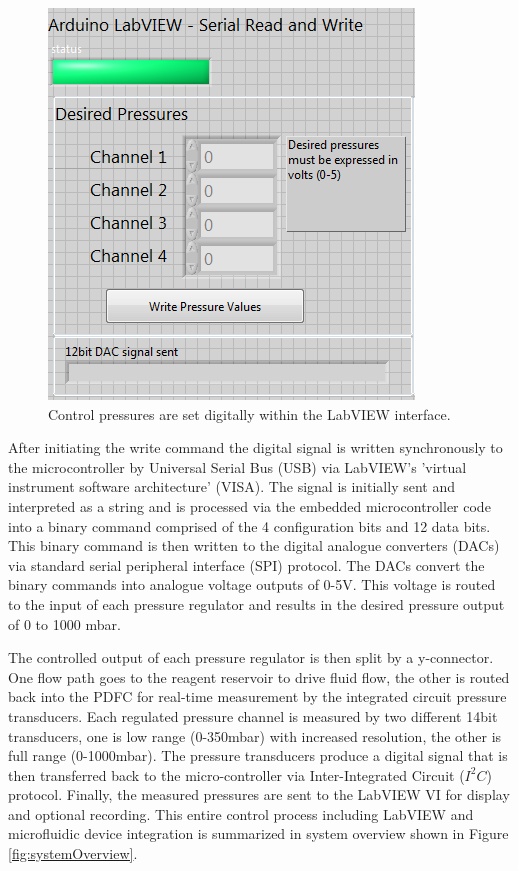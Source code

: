 \begin{figure}[H]
\centering 
\includegraphics[width=0.5\columnwidth]{writeVI.PNG} 
\caption[LabVIEW write command]{Control pressures are set digitally within the LabVIEW interface.} 
\label{fig:writeVI} 
\end{figure}

After initiating the write command the digital signal is written synchronously to the microcontroller by Universal Serial Bus (USB) via LabVIEW's 'virtual instrument software architecture' (VISA). The signal is initially sent and interpreted as a string and is processed via the embedded microcontroller code into a binary command comprised of the 4 configuration bits and 12 data bits. This binary command is then written to the digital analogue converters (DACs) via standard serial peripheral  interface (SPI) protocol. The DACs convert the binary commands into analogue voltage outputs of 0-5V. This voltage is routed to the input of each pressure regulator and results in the desired pressure output of 0 to 1000 mbar.

The controlled output of each pressure regulator is then split by a y-connector. One flow path goes to the reagent reservoir to drive fluid flow, the other is routed back into the PDFC for real-time measurement by the integrated circuit pressure transducers. Each regulated pressure channel is measured by two different 14bit transducers, one is low range (0-350mbar) with increased resolution, the other is full range (0-1000mbar). The pressure transducers produce a digital signal that is then transferred back to the micro-controller via Inter-Integrated Circuit ($I^2C$) protocol. Finally, the measured pressures are sent to the LabVIEW VI for display and optional recording. This entire control process including LabVIEW and microfluidic device integration is summarized in system overview shown in Figure \vref{fig:systemOverview}.



